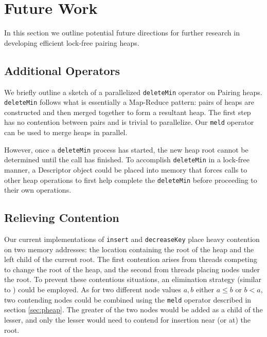 \documentclass{acm_proc_article-sp}
\begin{document}

\section{Future Work}
\label{sec:future}
In this section we
outline potential future directions for further research in developing efficient lock-free pairing heaps.

\subsection{Additional Operators}
We briefly outline a sketch of a parallelized \texttt{deleteMin} operator on Pairing heaps.
\texttt{deleteMin} follows what is essentially a Map-Reduce pattern: pairs of heaps are constructed
and then merged together to form a resultant heap. The first step has no contention between pairs
and is trivial to parallelize. Our \texttt{meld} operator can be used to merge heaps in parallel.

However, once a \texttt{deleteMin} process has started, the new heap root cannot be determined until
the call has finished.
To accomplish \texttt{deleteMin} in a lock-free manner, a Descriptor object could be placed into memory
that forces calls to other heap operations to first help complete the \texttt{deleteMin} before proceeding
to their own operations.

\subsection{Relieving Contention}
Our current implementations of \texttt{insert} and \texttt{decreaseKey} place
heavy contention on two memory addresses: the location containing the root of the heap
and the left child of the current root. The first contention arises from threads competing to
change the root of the heap, and the second from threads placing nodes under the root.
To prevent these contentious situations, an elimination strategy (similar to \cite{hendler04})
could be employed. As for two different node values $a,b$ either $a \leq b$ or $b < a$, two
contending nodes could be combined using the \texttt{meld} operator described in section \ref{sec:pheap}.
The greater of the two nodes would be added as a child of the lesser, and only the lesser would need
to contend for insertion near (or at) the root.
\end{document}
